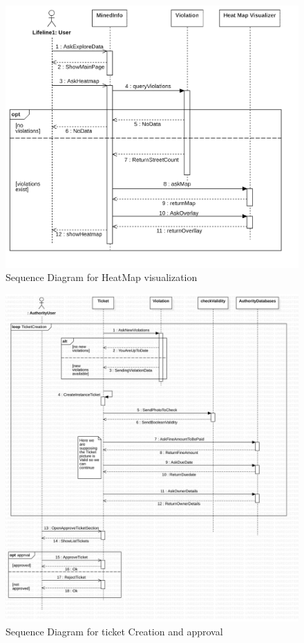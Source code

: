 \begin{figure}[H]
   \centering
     \includegraphics[width=\textwidth]{Images/SequenceHeatmap.png}
     \caption{Sequence Diagram for HeatMap visualization}   \label{fig:sequenceHeatmap}
\end{figure}

\begin{figure}[H]
   \centering
     \includegraphics[width=\textwidth]{Images/SequenceTicket.png}
     \caption{Sequence Diagram for ticket Creation and approval}   \label{fig:sequenceTicket}
\end{figure}

